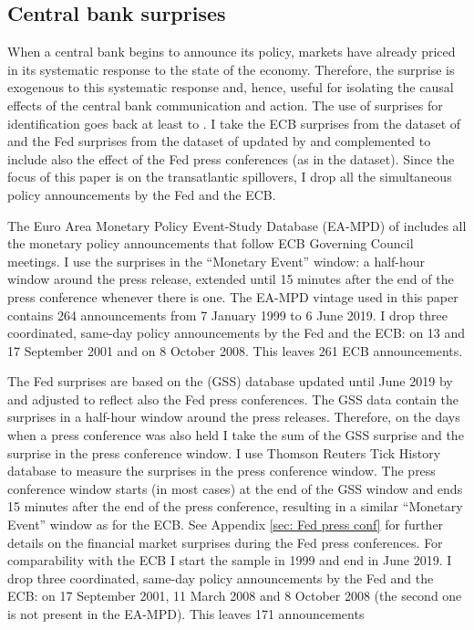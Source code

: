 \documentclass[a4paper,12pt]{article}
\begin{document}
\subsection{Central bank surprises}

When a central bank begins to announce its policy, markets have already priced in its systematic response
to the state of the economy. 
Therefore, the surprise is exogenous to this systematic response and, hence, useful for isolating the causal effects of the central bank communication and action.
The use of surprises for identification goes back at least to \cite{Kuttner_2001}. I
take the ECB surprises from the dataset of \cite{Altavilla_etal_2019}
and the Fed surprises from the dataset of \cite{Gurkaynak_Sack_Swanson_2005a} updated by \cite{Gurkaynak_Karasoy_Lee_2021} and
complemented to include also the effect of the Fed press conferences (as in the \citealt{Altavilla_etal_2019} dataset).
Since the focus of this paper is on the transatlantic spillovers, I drop all the simultaneous policy announcements
by the Fed and the ECB.

The Euro Area Monetary Policy Event-Study Database (EA-MPD) of \cite{Altavilla_etal_2019}
includes all the monetary policy announcements that follow ECB Governing Council meetings.
I use the surprises in the ``Monetary Event'' window: a half-hour window around the press release, extended until 15 minutes after the end of the press conference whenever there is one.
The EA-MPD vintage used in this paper contains 264 announcements from 7 January 1999 to 6 June 2019. I drop three coordinated, same-day policy announcements by the Fed and the ECB: on 13 and 17 September 2001 and on 8 October 2008. This leaves 261 ECB announcements.

The Fed surprises are based on the \cite{Gurkaynak_Sack_Swanson_2005a} (GSS) database
updated until June 2019 by \cite{Gurkaynak_Karasoy_Lee_2021}
and adjusted to reflect also the Fed press conferences.
The GSS data contain the surprises in a half-hour window around the press releases.
Therefore, on the days when a press conference was also held I take the sum of the GSS surprise and the surprise in the press conference window.
I use Thomson Reuters Tick History database to measure
the surprises in the press conference window. 
The press conference window starts (in most cases) at the end of the GSS window and 
ends 15 minutes after the end of the press conference,
resulting in a similar ``Monetary Event'' window as for the ECB.
See Appendix \ref{sec: Fed press conf} for further details on the financial market surprises during the Fed press conferences.
For comparability with the ECB I start the sample in 1999 and end in June 2019. I drop three coordinated, same-day policy announcements by the Fed and the ECB: on 17 September 2001, 11 March 2008 and 8 October 2008 (the second one is not present in the EA-MPD). This leaves 171 announcements
\end{document}
